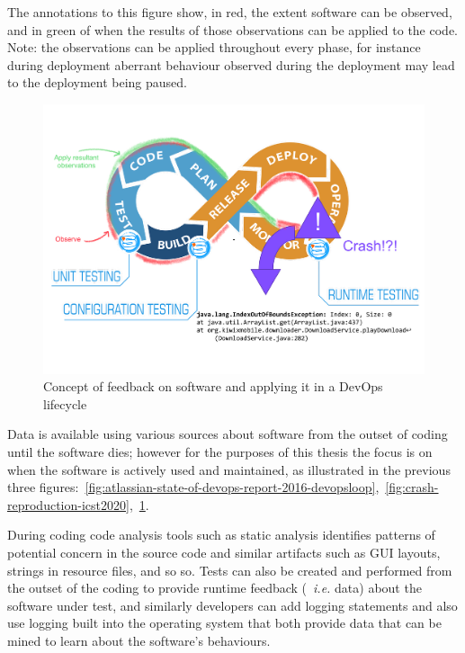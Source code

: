The annotations to this figure show, in red, the extent software can be observed, and in green of when the results of those observations can be applied to the code. Note: the observations can be applied throughout every phase, for instance during deployment aberrant behaviour observed during the deployment may lead to the deployment being paused.

\begin{figure}
    \includegraphics[width=\linewidth]{images/icst-2020/annotated-crash-reproduction.pdf}
    \caption[Concept of applying feedback on software in DevOps]{Concept of feedback on software and applying it in a DevOps lifecycle}
    \label{fig:oberve-and-apply-devops-loop}
\end{figure}

Data is available using various sources about software from the outset of coding until the software dies; however for the purposes of this thesis the focus is on when the software is actively used and maintained, as illustrated in the previous three figures:~\ref{fig:atlassian-state-of-devops-report-2016-devopsloop},~\ref{fig:crash-reproduction-icst2020},~\ref{fig:oberve-and-apply-devops-loop}. 

During coding code analysis tools such as static analysis identifies patterns of potential concern in the source code and similar artifacts such as GUI layouts, strings in resource files, and so so. Tests can also be created and performed from the outset of the coding to provide runtime feedback (~\emph{i.e.} data) about the software under test, and similarly developers can add logging statements and also use logging built into the operating system that both provide data that can be mined to learn about the software's behaviours.

